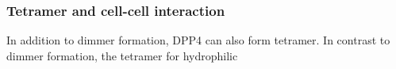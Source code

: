 \subsubsection{Tetramer and cell-cell interaction}

In addition to dimmer formation, DPP4 can also form tetramer. In contrast to dimmer formation, the tetramer for hydrophilic 